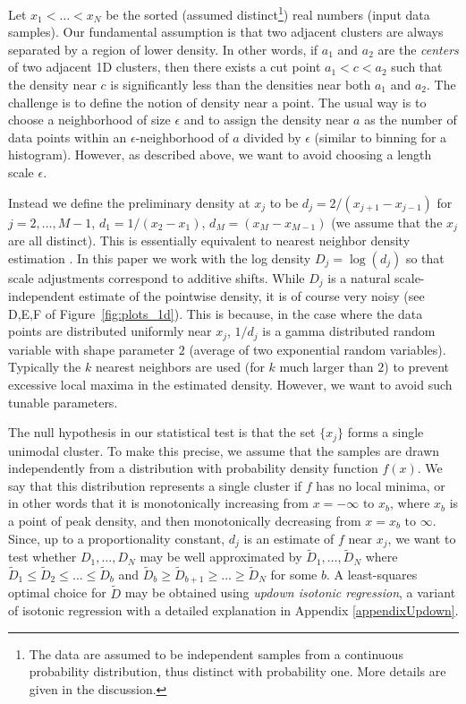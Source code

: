 \documentclass[10pt]{article}
\begin{document}
Let $x_1<\dots<x_N$ be the sorted (assumed distinct\footnote{The data are assumed to be independent samples from a continuous probability distribution, thus distinct with probability one. More details are given in the discussion.}) real numbers (input data samples). Our fundamental assumption is that two adjacent clusters are always separated by a region of lower density. In other words, if $a_1$ and $a_2$ are the \emph{centers} of two adjacent 1D clusters, then there exists a cut point $a_1<c<a_2$ such that the density near $c$ is significantly less than the densities near both $a_1$ and $a_2$. The challenge is to define the notion of density near a point. The usual way is to choose a neighborhood of size $\epsilon$ and to assign the density near $a$ as the number of data points within an $\epsilon$-neighborhood of $a$ divided by $\epsilon$ (similar to binning for a histogram). However, as described above, we want to avoid choosing a length scale $\epsilon$.

Instead we define the preliminary density at $x_j$ to be $d_j=2/(x_{j+1}-x_{j-1})$ for $j=2,\dots,M-1$, $d_1=1/(x_2-x_1)$, $d_M=(x_M-x_{M-1})$ (we assume that the $x_j$ are all distinct). This is essentially equivalent to nearest neighbor density estimation \cite[Ch.~15]{zaki-book}. In this paper we work with the log density $D_j=\log(d_j)$ so that scale adjustments correspond to additive shifts. While $D_j$ is a natural scale-independent estimate of the pointwise density, it is of course very noisy (see D,E,F of Figure~\ref{fig:plots_1d}). This is because, in the case where the data points are distributed uniformly near $x_j$, $1/d_j$ is a gamma distributed random variable with shape parameter $2$ (average of two exponential random variables). Typically the $k$ nearest neighbors are used (for $k$ much larger than $2$) to prevent excessive local maxima in the estimated density. However, we want to avoid such tunable parameters.

The null hypothesis in our statistical test is that the set $\{x_j\}$ forms a single unimodal cluster. To make this precise, we assume that the samples are drawn independently from a distribution with probability density function $f(x)$. We say that this distribution represents a single cluster if $f$ has no local minima, or in other words that it is monotonically increasing from $x=-\infty\text{ to }x_b$, where $x_b$ is a point of peak density, and then monotonically decreasing from $x=x_b\text{ to }\infty$. Since, up to a proportionality constant, $d_j$ is an estimate of $f$ near $x_j$, we want to test whether $D_1,\dots,D_N$ may be well approximated by $\tilde{D}_1,\dots,\tilde{D}_N$ where $\tilde{D}_1\leq \tilde{D}_2\leq \dots\leq \tilde{D}_b$ and $\tilde{D}_b\geq \tilde{D}_{b+1}\geq\dots \geq \tilde{D}_N$ for some $b$. A least-squares optimal choice for $\tilde{D}$ may be obtained using \emph{updown isotonic regression}, a variant of isotonic regression with a detailed explanation in Appendix \ref{appendixUpdown}. 
\end{document}
